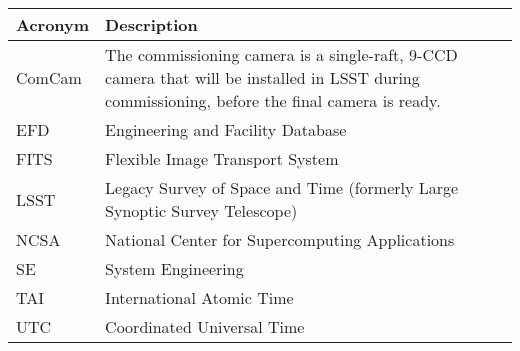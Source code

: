 \addtocounter{table}{-1}
\begin{longtable}{p{}p{}}\hline
\textbf{Acronym} & \textbf{Description}  \\\hline

ComCam & The commissioning camera is a single-raft, 9-CCD camera that will be installed in LSST during commissioning, before the final camera is ready. \\\hline
EFD & Engineering and Facility Database \\\hline
FITS & Flexible Image Transport System \\\hline
LSST & Legacy Survey of Space and Time (formerly Large Synoptic Survey Telescope) \\\hline
NCSA & National Center for Supercomputing Applications \\\hline
SE & System Engineering \\\hline
TAI & International Atomic Time \\\hline
UTC & Coordinated Universal Time \\\hline
\end{longtable}
